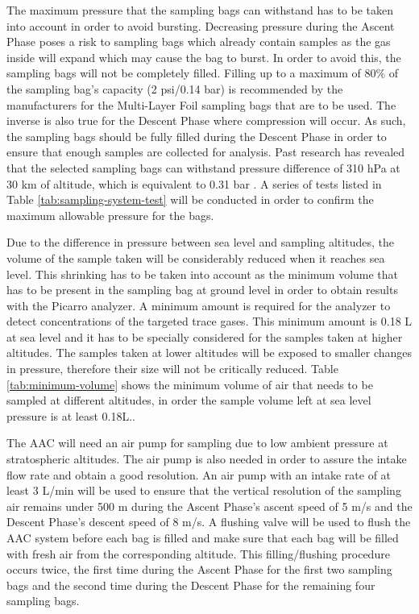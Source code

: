 The maximum pressure that the sampling bags can withstand has to be taken into account in order to avoid bursting. Decreasing pressure during the Ascent Phase poses a risk to sampling bags which already contain samples as the gas inside will expand which may cause the bag to burst. In order to avoid this, the sampling bags will not be completely filled. Filling up to a maximum of 80\% of the sampling bag's capacity (2 psi/0.14 bar) is recommended by the manufacturers for the Multi-Layer Foil sampling bags that are to be used. The inverse is also true for the Descent Phase where compression will occur. As such, the sampling bags should be fully filled during the Descent Phase in order to ensure that enough samples are collected for analysis. Past research has revealed that the selected sampling bags can withstand pressure difference of 310 hPa at 30 km of altitude, which is equivalent to 0.31 bar \cite{LISA}. A series of tests listed in Table \ref{tab:sampling-system-test} will be conducted in order to confirm the maximum allowable pressure for the bags.


Due to the difference in pressure between sea level and sampling altitudes, the volume of the sample taken will be considerably reduced when it reaches sea level. This shrinking has to be taken into account as the minimum volume that has to be present in the sampling bag at ground level in order to obtain results with the Picarro analyzer. A minimum amount is required for the analyzer to detect concentrations of the targeted trace gases. This minimum amount is 0.18 L at sea level and it has to be specially considered for the samples taken at higher altitudes. The samples taken at lower altitudes will be exposed to smaller changes in pressure, therefore their size will not be critically reduced. Table \ref{tab:minimum-volume} shows the minimum volume of air that needs to be sampled at different altitudes, in order the sample volume left at sea level pressure is at least 0.18L..  




The AAC will need an air pump for sampling due to low ambient pressure at stratospheric altitudes. The air pump is also needed in order to assure the intake flow rate and obtain a good resolution. An air pump with an intake rate of at least 3 L/min will be used to ensure that the vertical resolution of the sampling air remains under 500 m during the Ascent Phase's ascent speed of 5 m/s and the  Descent Phase's descent speed of 8 m/s. A flushing valve will be used to flush the AAC system before each bag is filled and make sure that each bag will be filled with fresh air from the corresponding altitude. This filling/flushing procedure occurs twice, the first time during the Ascent Phase for the first two sampling bags and the second time during the Descent Phase for the remaining four sampling bags.

